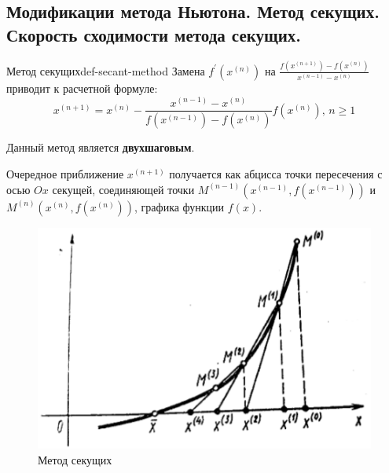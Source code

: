 \documentclass[14pt]{extarticle}
\begin{document}
\clearpage
\subsection{Модификации метода Ньютона. Метод секущих. Скорость сходимости метода секущих.}

    \begin{definition}{Метод секущих}{def-secant-method}
        Замена $f^{'}(x^{(n)})$ на $\frac{f(x^{(n + 1)}) - f(x^{(n)})}{x^{(n - 1)} - x^{(n)}}$ приводит к расчетной формуле:
        $$x^{(n + 1)} = x^{(n)} - \frac{x^{(n - 1)} - x^{(n)}}{f(x^{(n - 1)}) - f(x^{(n)})} f(x^{(n)}) \text{, } n \geq 1$$

        Данный метод является \textbf{двухшаговым}.
    
        \vspace{\baselineskip}

        Очередное приближение $x^{(n + 1)}$ получается как абцисса точки пересечения с осью $Ox$ секущей, соединяющей точки $M^{(n - 1)}(x^{(n - 1)}, f(x^{(n - 1)}))$ и $M^{(n)}(x^{(n)}, f(x^{(n)}))$, графика функции $f(x)$.
    \end{definition}

    \begin{figure}[H]
        \centering
        \includegraphics[scale=0.8]{images/secant-method-ex.png}
        \caption{Метод секущих}
        \label{fig:secant-method}
    \end{figure}
\end{document}
